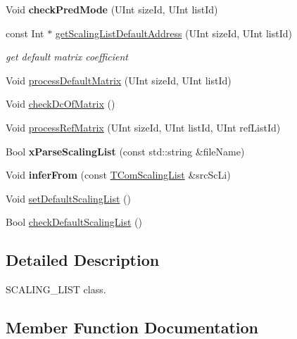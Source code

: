 \begin{DoxyCompactItemize}
\item 
\mbox{\label{class_t_com_scaling_list_af696e9efeb53d0661b6b0abddeca447d}} 
Void {\bfseries check\+Pred\+Mode} (U\+Int size\+Id, U\+Int list\+Id)
\item 
const Int $\ast$ \hyperlink{class_t_com_scaling_list_a350f921a49148b73860de67d57ddd51b}{get\+Scaling\+List\+Default\+Address} (U\+Int size\+Id, U\+Int list\+Id)
\begin{DoxyCompactList}\small\item\em get default matrix coefficient \end{DoxyCompactList}\item 
Void \hyperlink{class_t_com_scaling_list_a97e70eaa265724a81a202c2a38b9d879}{process\+Default\+Matrix} (U\+Int size\+Id, U\+Int list\+Id)
\item 
Void \hyperlink{class_t_com_scaling_list_aa05e7f144d39d205b8b6250d44a8fbf3}{check\+Dc\+Of\+Matrix} ()
\item 
Void \hyperlink{class_t_com_scaling_list_a92e63bd00c7c2645debc8ea87b8671f1}{process\+Ref\+Matrix} (U\+Int size\+Id, U\+Int list\+Id, U\+Int ref\+List\+Id)
\item 
\mbox{\label{class_t_com_scaling_list_af6c457729feea3eb085fd65e280ce699}} 
Bool {\bfseries x\+Parse\+Scaling\+List} (const std\+::string \&file\+Name)
\item 
\mbox{\label{class_t_com_scaling_list_a3426f045263a467ffbf3fe59d6eccc0f}} 
Void {\bfseries infer\+From} (const \hyperlink{class_t_com_scaling_list}{T\+Com\+Scaling\+List} \&src\+Sc\+Li)
\item 
Void \hyperlink{class_t_com_scaling_list_a14c7945cc8ad56146969307eadd066a1}{set\+Default\+Scaling\+List} ()
\item 
Bool \hyperlink{class_t_com_scaling_list_ace5822827a13edfd286189816315adcd}{check\+Default\+Scaling\+List} ()
\end{DoxyCompactItemize}


\subsection{Detailed Description}
S\+C\+A\+L\+I\+N\+G\+\_\+\+L\+I\+ST class. 

\subsection{Member Function Documentation}
\mbox{\label{class_t_com_scaling_list_aa05e7f144d39d205b8b6250d44a8fbf3}} 

